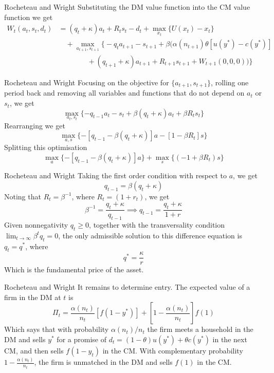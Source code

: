 \documentclass[aspectratio=169,xcolor=dvipsnames]{beamer}
\begin{document}
\begin{frame}{Rocheteau and Wright}
    Substituting the DM value function into the CM value function we get
    \begin{align*}
        W_t(a_t, s_t, d_t) &= (q_t + \kappa) a_t + R_t s_t - d_t + \max_{x_t}\{U(x_t) - x_t\} \\
        &\quad + \max_{a_{t+1}, s_{t+1}} \Big\{ -q_t a_{t+1} - s_{t+1} + \beta \big( \alpha(n_{t+1}) \theta [u(y^*) - c(y^*)] \\
        &\qquad\qquad + (q_{t+1} + \kappa) a_{t+1} + R_{t+1} s_{t+1} + W_{t+1}(0,0,0) \big) \Big\}
    \end{align*}
\end{frame}

\begin{frame}{Rocheteau and Wright}
    Focusing on the objective for $\{a_{t+1}, s_{t+1}\}$, rolling one period back and removing all variables and functions that do not depend on $a_t$ or $s_t$, we get
    \[
        \max_{a_t, s_t} \{-q_{t-1} a_t - s_t + \beta (q_t + \kappa) a_t + \beta R_t s_t\}
    \]
    Rearranging we get
    \[
        \max_{a, s}\{-[q_{t-1} - \beta(q_t + \kappa)] a - [1 - \beta R_t] s\}
    \]
    Splitting this optimisation
    \[
        \max_a \{-[q_{t-1} - \beta(q_t + \kappa)] a\} + \max_s \{(-1 + \beta R_t) s\}
    \]
\end{frame}

\begin{frame}{Rocheteau and Wright}
    Taking the first order condition with respect to $a$, we get
    \[
        q_{t-1} = \beta (q_t + \kappa)
    \]
    Noting that $R_t = \beta^{-1}$, where $R_t = (1 + r_t)$, we get
    \[
        \beta^{-1} = \frac{q_t + \kappa}{q_{t-1}} \implies q_{t-1} = \frac{q_t + \kappa}{1 + r}
    \]
    Given nonnegativity $q_t \ge 0$, together with the transversality condition $\lim_{t \to \infty} \beta^t q_t = 0$, the only admissible solution to this difference equation is $q_t = q^*$, where
    \[
        q^* = \frac{\kappa}{r}
    \]
    Which is the fundamental price of the asset.
\end{frame}

\begin{frame}{Rocheteau and Wright}
    It remains to determine entry. The expected value of a firm in the DM at $t$ is
    \[
        \Pi_t = \frac{\alpha(n_t)}{n_t}[f(1 - y^*)] + \left[1 - \frac{\alpha(n_t)}{n_t}\right] f(1)
    \]
    Which says that with probability $\alpha(n_t)/n_t$ the firm meets a household in the DM and sells $y^*$ for a promise of $d_t = (1 - \theta) u(y^*) + \theta c(y^*)$ in the next CM, and then sells $f(1 - y_t)$ in the CM. With complementary probability $1 - \frac{\alpha(n_t)}{n_t}$, the firm is unmatched in the DM and sells $f(1)$ in the CM.
\end{frame}
\end{document}
